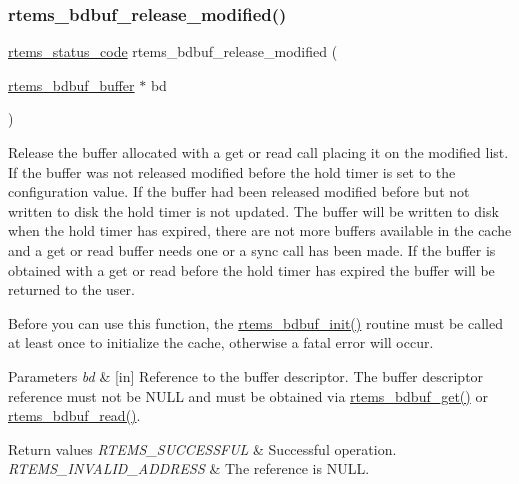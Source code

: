 \subsubsection{\texorpdfstring{rtems\_bdbuf\_release\_modified()}{rtems\_bdbuf\_release\_modified()}}
{\footnotesize\ttfamily \mbox{\hyperlink{group__ClassicStatus_ga545d41846817eaba6143d52ee4d9e9fe}{rtems\+\_\+status\+\_\+code}} rtems\+\_\+bdbuf\+\_\+release\+\_\+modified (\begin{DoxyParamCaption}\item[{\mbox{\hyperlink{structrtems__bdbuf__buffer}{rtems\+\_\+bdbuf\+\_\+buffer}} $\ast$}]{bd }\end{DoxyParamCaption})}

Release the buffer allocated with a get or read call placing it on the modified list. If the buffer was not released modified before the hold timer is set to the configuration value. If the buffer had been released modified before but not written to disk the hold timer is not updated. The buffer will be written to disk when the hold timer has expired, there are not more buffers available in the cache and a get or read buffer needs one or a sync call has been made. If the buffer is obtained with a get or read before the hold timer has expired the buffer will be returned to the user.

Before you can use this function, the \mbox{\hyperlink{group__rtems__bdbuf_gaf19ee8ba7815e24767b6a91e200a78bc}{rtems\+\_\+bdbuf\+\_\+init()}} routine must be called at least once to initialize the cache, otherwise a fatal error will occur.


\begin{DoxyParams}{Parameters}
{\em bd} & \mbox{[}in\mbox{]} Reference to the buffer descriptor. The buffer descriptor reference must not be {\ttfamily N\+U\+LL} and must be obtained via \mbox{\hyperlink{group__rtems__bdbuf_ga05fa34cc25ade6d09797b0dc88cf33e1}{rtems\+\_\+bdbuf\+\_\+get()}} or \mbox{\hyperlink{group__rtems__bdbuf_ga8546cefc842eef10cdb5b38a6cead9f7}{rtems\+\_\+bdbuf\+\_\+read()}}.\\
\hline
\end{DoxyParams}

\begin{DoxyRetVals}{Return values}
{\em R\+T\+E\+M\+S\+\_\+\+S\+U\+C\+C\+E\+S\+S\+F\+UL} & Successful operation. \\
\hline
{\em R\+T\+E\+M\+S\+\_\+\+I\+N\+V\+A\+L\+I\+D\+\_\+\+A\+D\+D\+R\+E\+SS} & The reference is N\+U\+LL. \\
\hline
\end{DoxyRetVals}
\mbox{\label{group__rtems__bdbuf_ga649b3b4fb368921f579a0204552a7a60}} 
